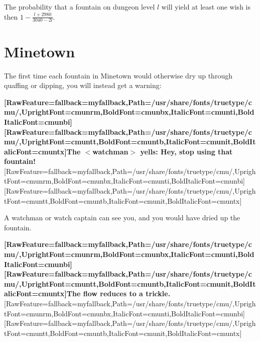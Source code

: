 The probability that a fountain on dungeon level {$
l$} will yield at least one wish is then {$
1-\frac{l+2980}{3040-2l}$}.



\section{Minetown}
\label{8}
The first time each fountain in Minetown\footnotemark[86] would otherwise dry up through quaffing or dipping, you will instead get a warning:



{\bfseries \allowbreak{}\setmainfont{cmunbx.ttf}[RawFeature={fallback=myfallback},Path=/usr/share/fonts/truetype/cmu/,UprightFont=cmunrm,BoldFont=cmunbx,ItalicFont=cmunti,BoldItalicFont=cmunbi]\setmonofont{cmunbx.ttf}[RawFeature={fallback=myfallback},Path=/usr/share/fonts/truetype/cmu/,UprightFont=cmuntt,BoldFont=cmuntb,ItalicFont=cmunit,BoldItalicFont=cmuntx]\bfseries The {\mbox{$<$}}watchman{\mbox{$>$}} yells: Hey, stop using that fountain!}\allowbreak{}\setmainfont{cmunrm.ttf}[RawFeature={fallback=myfallback},Path=/usr/share/fonts/truetype/cmu/,UprightFont=cmunrm,BoldFont=cmunbx,ItalicFont=cmunti,BoldItalicFont=cmunbi]\setmonofont{cmunrm.ttf}[RawFeature={fallback=myfallback},Path=/usr/share/fonts/truetype/cmu/,UprightFont=cmuntt,BoldFont=cmuntb,ItalicFont=cmunit,BoldItalicFont=cmuntx]

\begin{myquote}
\item{}A watchman\footnotemark[87] or watch captain\footnotemark[88] can see you, and you would have dried up the fountain.
\end{myquote}

{\bfseries \allowbreak{}\setmainfont{cmunbx.ttf}[RawFeature={fallback=myfallback},Path=/usr/share/fonts/truetype/cmu/,UprightFont=cmunrm,BoldFont=cmunbx,ItalicFont=cmunti,BoldItalicFont=cmunbi]\setmonofont{cmunbx.ttf}[RawFeature={fallback=myfallback},Path=/usr/share/fonts/truetype/cmu/,UprightFont=cmuntt,BoldFont=cmuntb,ItalicFont=cmunit,BoldItalicFont=cmuntx]\bfseries The flow reduces to a trickle.}\allowbreak{}\setmainfont{cmunrm.ttf}[RawFeature={fallback=myfallback},Path=/usr/share/fonts/truetype/cmu/,UprightFont=cmunrm,BoldFont=cmunbx,ItalicFont=cmunti,BoldItalicFont=cmunbi]\setmonofont{cmunrm.ttf}[RawFeature={fallback=myfallback},Path=/usr/share/fonts/truetype/cmu/,UprightFont=cmuntt,BoldFont=cmuntb,ItalicFont=cmunit,BoldItalicFont=cmuntx]


